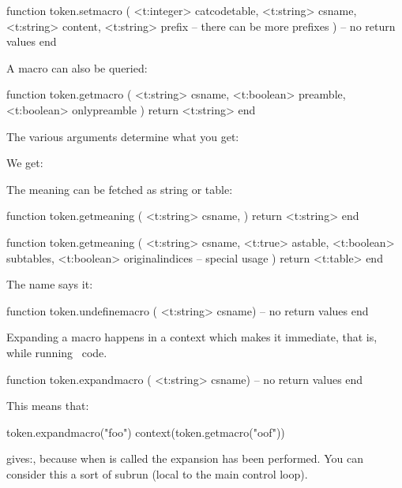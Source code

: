 function token.setmacro (
    <t:integer> catcodetable,
    <t:string>  csname,
    <t:string>  content,
    <t:string>  prefix
 -- there can be more prefixes
)
    -- no return values
end
\stoptyping

A macro can also be queried:

\starttyping[option=LUA]
function token.getmacro (
    <t:string>  csname,
    <t:boolean> preamble,
    <t:boolean> onlypreamble
)
    return <t:string>
end
\stoptyping

The various arguments determine what you get:

\startbuffer
\def\foo#1{foo: #1}

\stopbuffer

\typebuffer

We get:

\startlines
\getbuffer
\stoplines

The meaning can be fetched as string or table:

\starttyping[option=LUA]
function token.getmeaning (
    <t:string>  csname,
)
    return <t:string>
end

function token.getmeaning (
    <t:string>  csname,
    <t:true>    astable,
    <t:boolean> subtables,
    <t:boolean> originalindices -- special usage
)
    return <t:table>
end
\stoptyping

The name says it:

\starttyping[option=LUA]
function token.undefinemacro ( <t:string> csname)
    -- no return values
end
\stoptyping

Expanding a macro happens in a  context which makes it
immediate, that is, while running \LUA\ code.

\starttyping[option=LUA]
function token.expandmacro ( <t:string> csname)
    -- no return values
end
\stoptyping

This means that:

\startbuffer
\def\foo{\scratchdimen100pt \edef\oof{\the\scratchdimen}}
\startluacode
token.expandmacro("foo")
context(token.getmacro("oof"))
\stopluacode
\stopbuffer

\typebuffer

gives:\inlinebuffer, because when  is called the expansion has
been performed. You can consider this a sort of subrun (local to the main control
loop).

